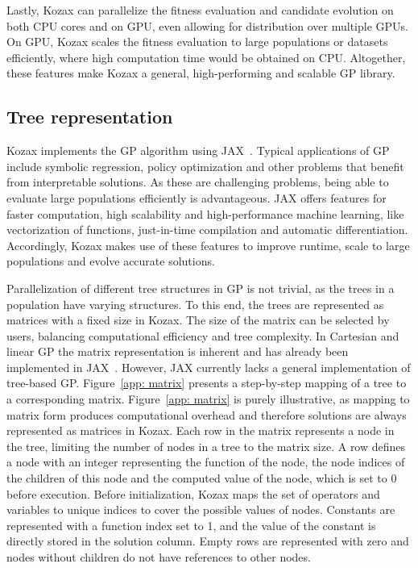 \documentclass{article}
\begin{document}
Lastly, Kozax can parallelize the fitness evaluation and candidate evolution on both CPU cores and on GPU, even allowing for distribution over multiple GPUs. On GPU, Kozax scales the fitness evaluation to large populations or datasets efficiently, where high computation time would be obtained on CPU. Altogether, these features make Kozax a general, high-performing and scalable GP library.

\subsection{Tree representation}
Kozax implements the GP algorithm using JAX~\cite{jax2018github}. Typical applications of GP include symbolic regression, policy optimization and other problems that benefit from interpretable solutions. As these are challenging problems, being able to evaluate large populations efficiently is advantageous. JAX offers features for faster computation, high scalability and high-performance machine learning, like vectorization of functions, just-in-time compilation and automatic differentiation. Accordingly, Kozax makes use of these features to improve runtime, scale to large populations and evolve accurate solutions.

Parallelization of different tree structures in GP is not trivial, as the trees in a population have varying structures. To this end, the trees are represented as matrices with a fixed size in Kozax. The size of the matrix can be selected by users, balancing computational efficiency and tree complexity. In Cartesian and linear GP the matrix representation is inherent and has already been implemented in JAX~\cite{nadizar2024naturally}. However, JAX currently lacks a general implementation of tree-based GP. Figure~\ref{app: matrix} presents a step-by-step mapping of a tree to a corresponding matrix. Figure~\ref{app: matrix} is purely illustrative, as mapping to matrix form produces computational overhead and therefore solutions are always represented as matrices in Kozax. Each row in the matrix represents a node in the tree, limiting the number of nodes in a tree to the matrix size. A row defines a node with an integer representing the function of the node, the node indices of the children of this node and the computed value of the node, which is set to 0 before execution. Before initialization, Kozax maps the set of operators and variables to unique indices to cover the possible values of nodes. Constants are represented with a function index set to 1, and the value of the constant is directly stored in the solution column. Empty rows are represented with zero and nodes without children do not have references to other nodes.
\end{document}
